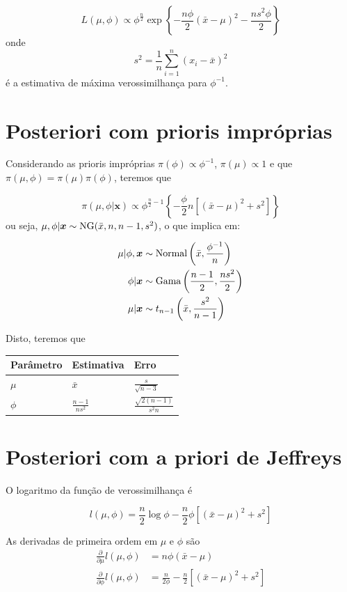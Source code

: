 \documentclass[
  letterpaper,
  DIV=11,
  numbers=noendperiod]{scrreprt}
\theoremstyle{definition}
\theoremstyle{definition}
\theoremstyle{plain}
\theoremstyle{remark}
\begin{document}
\[L(\mu,\phi)\propto \phi^{\frac{n}{2}}\exp\left\{-\frac{n\phi}{2}(\bar{x}-\mu)^2 -\frac{ns^2\phi}{2}\right\}\]
onde \[s^2=\frac{1}{n}\sum_{i=1}^n(x_i-\bar{x})^2\] é a estimativa de
máxima verossimilhança para \(\phi^{-1}\).

\section{Posteriori com prioris
impróprias}\label{posteriori-com-prioris-impruxf3prias}

Considerando as prioris impróprias \(\pi(\phi)\propto \phi^{-1}\),
\(\pi(\mu)\propto 1\) e que \(\pi(\mu,\phi)=\pi(\mu)\pi(\phi)\), teremos
que

\[\pi(\mu,\phi|\boldsymbol{x})\propto \phi^{\frac{n}{2}-1}\left\{-\frac{\phi}{2}n\left[ (\bar{x}-\mu)^2 +s^2\right]\right\}\]
ou seja, \(\mu,\phi|\boldsymbol{x}\sim\hbox{NG}(\bar{x},n,n-1,s^2)\), o
que implica em:

\[\begin{align}
\mu|\phi,\boldsymbol{x}&\sim\hbox{Normal}\left(\bar{x},\frac{\phi^{-1}}{n}\right)\\
\phi|\boldsymbol{x}&\sim\hbox{Gama}\left(\frac{n-1}{2},\frac{ns^2}{2}\right)\\
\mu|\boldsymbol{x}&\sim t_{n-1}\left(\bar{x},\frac{s^2}{n-1}\right)
\end{align}\]

Disto, teremos que

\begin{longtable}[]{@{}lll@{}}
\toprule\noalign{}
Parâmetro & Estimativa & Erro \\
\midrule\noalign{}
\endhead
\bottomrule\noalign{}
\endlastfoot
\(\mu\) & \(\bar{x}\) & \(\frac{s}{\sqrt{n-3}}\) \\
\(\phi\) & \(\frac{n-1}{ns^2}\) & \(\frac{\sqrt{2(n-1)}}{s^2n}\) \\
\end{longtable}

\section{Posteriori com a priori de
Jeffreys}\label{posteriori-com-a-priori-de-jeffreys}

O logaritmo da função de verossimilhança é

\[l(\mu,\phi)=\frac{n}{2}\log\phi -\frac{n}{2}\phi\left[(\bar{x}-\mu)^2 + s^2\right]\]

As derivadas de primeira ordem em \(\mu\) e \(\phi\) são \[\begin{align}
\frac{\partial}{\partial \mu}l(\mu,\phi)&=n\phi(\bar{x}-\mu)\\
\frac{\partial}{\partial \phi}l(\mu,\phi)&=\frac{n}{2\phi}-\frac{n}{2}\left[(\bar{x}-\mu)^2 + s^2\right]\\
\end{align}\]
\end{document}

